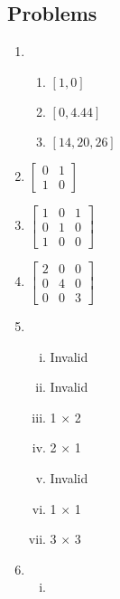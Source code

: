 \documentclass{article}
\begin{document}
    \subsection{Problems}
    \begin{enumerate}
        \item
            \begin{enumerate}
                \item $[1, 0]$
                \item $[0, 4.44]$
                \item $[14, 20, 26]$
            \end{enumerate}
        \item 
            $
            \begin{bmatrix}
                0 & 1 \\
                1 & 0
            \end{bmatrix}
            $
        \item 
            $
            \begin{bmatrix}
                1 & 0 & 1 \\
                0 & 1 & 0 \\
                1 & 0 & 0
            \end{bmatrix}
            $
        \item 
            $
            \begin{bmatrix}
                2 & 0 & 0 \\
                0 & 4 & 0 \\
                0 & 0 & 3
            \end{bmatrix}
            $
        \item 
            \begin{enumerate}[(i)]
                \item Invalid
                \item Invalid
                \item 1 $\times$ 2
                \item 2 $\times$ 1
                \item Invalid
                \item 1 $\times$ 1
                \item 3 $\times$ 3
            \end{enumerate}
        \item 
            \begin{enumerate}[(i)]
                \item 

\end{enumerate}
\end{enumerate}
\end{document}
